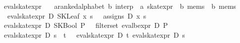 \documentclass{llncs}
\begin{document}
\begin{isabellebody}
\isanewline
{}\isamarkupfalse%
\ eval{}skat{}expr\ {}{}\isanewline
\ \ {}{}{}a{}{}ranked{}alphabet{}\ {}b{}\ interp\ {}\ {}a\ skat{}expr\ {}\ {}b\ mems\ {}\ {}b\ mems{}\isanewline
\ \ \isanewline
\ \ {}eval{}skat{}expr\ D\ {}SKLeaf\ x\ s{}\ {}\ {}\ assigns\ D\ x\ s\ {}{}\isanewline
{}\ {}eval{}skat{}expr\ D\ {}SKBool\ P{}\ {}\ {}\ filter{}set\ {}eval{}bexpr\ D\ P{}\ {}{}\isanewline
{}\ {}eval{}skat{}expr\ D\ {}s\ {}{}{}\ t{}\ {}\ {}\ eval{}skat{}expr\ D\ t\ {}eval{}skat{}expr\ D\ s\ {}{}{}\isanewline

\end{isabellebody}
\end{document}
